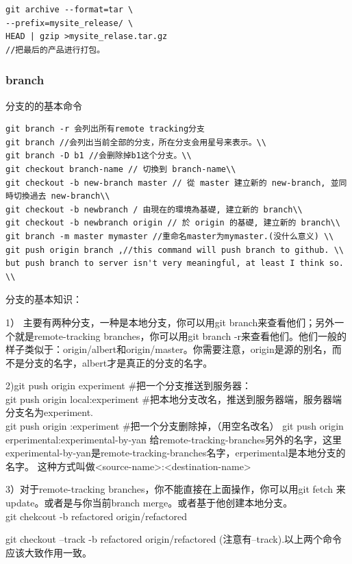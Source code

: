 \documentclass[a4paper,12pt,twoside]{book}
\begin{document}
\begin{CJK*}{UTF8}{song}
\begin{verbatim}
git archive --format=tar \
--prefix=mysite_release/ \
HEAD | gzip >mysite_relase.tar.gz
//把最后的产品进行打包。
\end{verbatim}


\subsubsection{branch}
分支的的基本命令
\begin{verbatim}
git branch -r 会列出所有remote tracking分支
git branch //会列出当前全部的分支，所在分支会用星号来表示。\\
git branch -D b1 //会删除掉b1这个分支。\\
git checkout branch-name // 切換到 branch-name\\
git checkout -b new-branch master // 從 master 建立新的 new-branch, 並同時切換過去 new-branch\\
git checkout -b newbranch / 由現在的環境為基礎, 建立新的 branch\\
git checkout -b newbranch origin // 於 origin 的基礎, 建立新的 branch\\
git branch -m master mymaster //重命名master为mymaster.(没什么意义) \\
git push origin branch ,//this command will push branch to github. \\
but push branch to server isn't very meaningful, at least I think so. \\
\end{verbatim}

分支的基本知识：\par
1） 主要有两种分支，一种是本地分支，你可以用git branch来查看他们；另外一个就是remote-tracking branches，你可以用git branch -r来查看他们。他们一般的样子类似于：origin/albert和origin/master。你需要注意，origin是源的别名，而不是分支的名字，albert才是真正的分支的名字。\par

2)git push origin experiment \#把一个分支推送到服务器：\\
git push origin local:experiment \#把本地分支改名，推送到服务器端，服务器端分支名为experiment. \\
git push origin :experiment \#把一个分支删除掉，（用空名改名） git push origin erperimental:experimental-by-yan 给remote-tracking-branches另外的名字，这里experimental-by-yan是remote-tracking-branches名字，erperimental是本地分支的名字。 这种方式叫做<source-name>:<destination-name> \par

3）对于remote-tracking branches，你不能直接在上面操作，你可以用git fetch 来 update。或者是与你当前branch merge。或者基于他创建本地分支。\\
git chekcout -b refactored origin/refactored \par
git checkout --track -b refactored origin/refactored (注意有--track).以上两个命令应该大致作用一致。 \par




\end{CJK*}
\end{document}
